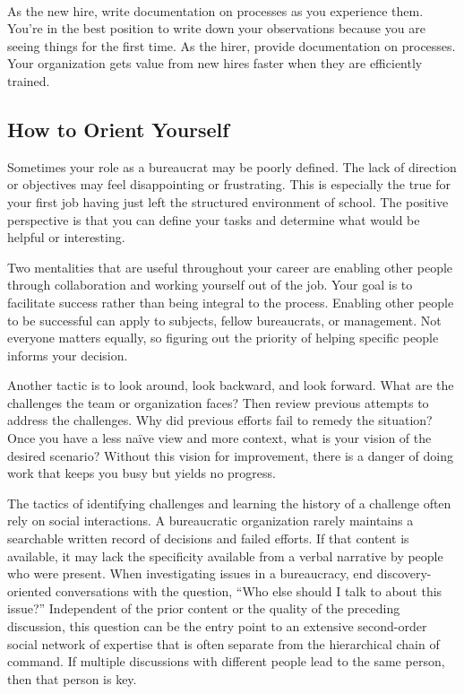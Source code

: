 \ \\
As the new hire, write documentation on processes as you experience them. You're in the best position to write down your observations because you are seeing things for the first time. %
As the hirer, provide documentation on processes. Your organization gets value from new hires faster when they are efficiently trained. 

\subsection*{How to Orient Yourself}

Sometimes your role as a bureaucrat may be poorly defined. The lack of direction or objectives may feel disappointing or frustrating. This is especially the true for your first job having just left the structured environment of school. The positive perspective is that you can define your tasks and determine what would be helpful or interesting. 

Two mentalities that are useful throughout your career are enabling other people through collaboration and working yourself out of the job. Your goal is to facilitate success rather than being integral to the process. Enabling other people to be successful can apply to subjects, fellow bureaucrats, or management. Not everyone matters equally, so figuring out the priority of helping specific people informs your decision. 

Another tactic is to look around, look backward, and look forward. What are the challenges the team or organization faces? Then review previous attempts to address the challenges. Why did previous efforts fail to remedy the situation? Once you have a less na\"ive view and more context, what is your vision of the desired scenario? Without this vision for improvement, there is a danger of doing work that keeps you busy but yields no progress. 

The tactics of identifying challenges and learning the history of a challenge often rely on social interactions. A bureaucratic organization rarely maintains a searchable written record of decisions and failed efforts. If that content is available, it may lack the specificity available from a verbal narrative by people who were present. When investigating issues in a bureaucracy, end discovery-oriented conversations with the question, ``Who else should I talk to about this issue?'' 
%
%
Independent of the prior content or the quality of the preceding discussion, this question can be the entry point to an extensive second-order social network of expertise that is often separate from the hierarchical chain of command. If multiple  discussions with different people lead to the same person, then that person is key. 

